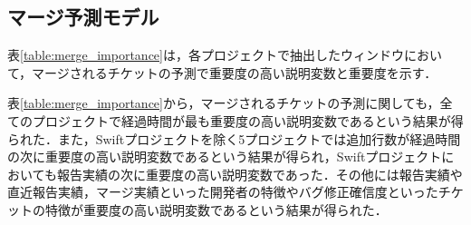 \documentclass[11pt]{jreport}
\begin{document}
\begin{table}[t]
\caption{レビュー予測モデルにおいて重要度の高い説明変数の正例と負例の有意差および違い}
\label{table:review_importance_yuisa}
\centering
\vspace{0.5zh}
\end{table}


\subsection{マージ予測モデル}
表\ref{table:merge_importance}は，各プロジェクトで抽出したウィンドウにおいて，マージされるチケットの予測で重要度の高い説明変数と重要度を示す．

表\ref{table:merge_importance}から，マージされるチケットの予測に関しても，全てのプロジェクトで経過時間が最も重要度の高い説明変数であるという結果が得られた．また，Swiftプロジェクトを除く5プロジェクトでは追加行数が経過時間の次に重要度の高い説明変数であるという結果が得られ，Swiftプロジェクトにおいても報告実績の次に重要度の高い説明変数であった．その他には報告実績や直近報告実績，マージ実績といった開発者の特徴やバグ修正確信度といったチケットの特徴が重要度の高い説明変数であるという結果が得られた．
\end{document}
